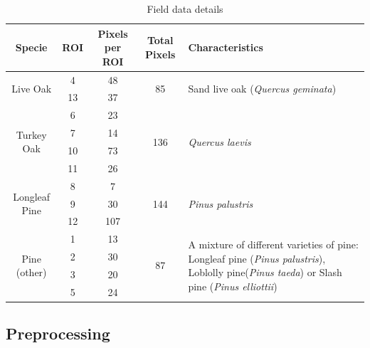 \documentclass[remotesensing,article,accept,moreauthors,pdftex,12pt,a4paper]{mdpi}
\begin{document}

\begin{table}
\begin{center}

    \begin{tabular}{ | c | c | c | c | p{7cm} | }
    \hline
    Specie & ROI & Pixels per ROI & Total Pixels & Characteristics \\
    \hline
    \multirow{2}{*}{Live Oak} & 4  & 48 & \multirow{2}{*}{85} & \multirow{2}{*}{Sand live oak (\textit{Quercus geminata})} \\ 
 & 13 & 37 & & \\    
    \hline
    \multirow{4}{*}{Turkey Oak} & 6 & 23 &\multirow{4}{*}{136} & \multirow{4}{*}{\textit{Quercus laevis}} \\ 
     & 7 & 14 & & \\    
     & 10 & 73 &  & \\    
     & 11 & 26 & & \\    
    \hline
    \multirow{3}{*}{Longleaf Pine} & 8 & 7 & \multirow{3}{*}{144} & \multirow{3}{*}{\textit{Pinus palustris}} \\ 
     & 9 & 30 &  & \\    
     & 12 & 107 & & \\
     \hline
    \multirow{4}{*}{Pine (other)} & 1 & 13 & \multirow{4}{*}{87} & \multirow{4}{7cm}{A mixture of different varieties of pine:  Longleaf pine (\textit{Pinus palustris}), Loblolly pine(\textit{Pinus taeda}) or Slash pine (\textit{Pinus elliottii})} \\
     & 2 & 30 & & \\    
     & 3 & 20 & & \\    
     & 5 & 24 & & \\
    \hline
    
    \end{tabular}
    \caption{Field data details}
    \label{table:field data}
    \end{center}

\end{table}








\subsection{Preprocessing}
\end{document}
